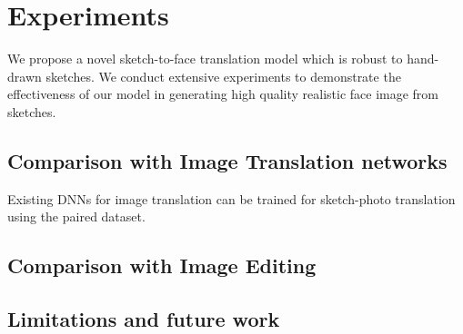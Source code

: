 \section{Experiments}
\label{sec:experiments}

We propose a novel sketch-to-face translation model which is robust to hand-drawn sketches. We conduct extensive experiments to demonstrate the effectiveness of our model in generating high quality realistic face image from sketches. 


\subsection{Comparison with Image Translation networks}

Existing DNNs for image translation can be trained for sketch-photo translation using the paired dataset.

\subsection{Comparison with Image Editing}


\subsection{Limitations and future work}

\